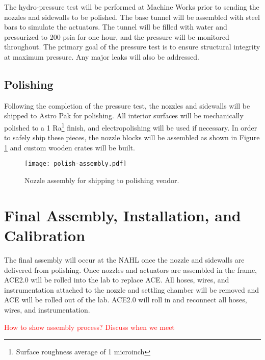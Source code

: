 The hydro-pressure test will be performed at Machine Works prior to sending the nozzles and sidewalls to be polished. The base tunnel will be assembled with steel bars to simulate the actuators. The tunnel will be filled with water and pressurized to 200 psia for one hour, and the pressure will be monitored throughout. The primary goal of the pressure test is to ensure structural integrity at maximum pressure. Any major leaks will also be addressed.

\subsection{Polishing}

Following the completion of the pressure test, the nozzles and sidewalls will be shipped to Astro Pak for polishing. All interior surfaces will be mechanically polished to a 1 Ra\footnote{Surface roughness average of 1 microinch} finish, and electropolishing will be used if necessary. In order to safely ship these pieces, the nozzle blocks will be assembled as shown in Figure \ref{fig:polish-assembly} and custom wooden crates will be built.

\begin{figure}[ht!]
    \centering
    \texttt{[image: polish-assembly.pdf]}
    \caption{Nozzle assembly for shipping to polishing vendor.}
    \label{fig:polish-assembly}
\end{figure}

\section{Final Assembly, Installation, and Calibration}

The final assembly will occur at the NAHL once the nozzle and sidewalls are delivered from polishing. Once nozzles and actuators are assembled in the frame, ACE2.0 will be rolled into the lab to replace ACE. All hoses, wires, and instrumentation attached to the nozzle and settling chamber will be removed and ACE will be rolled out of the lab. ACE2.0 will roll in and reconnect all hoses, wires, and instrumentation.

\textcolor{red}{How to show assembly process? Discuss when we meet}


